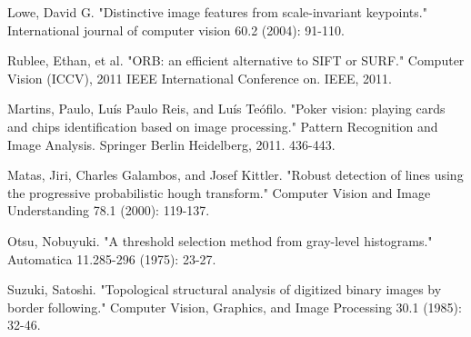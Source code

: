 \documentclass[journal,twoside]{IEEEtran}
\begin{document}
\begin{thebibliography}{9}

Lowe, David G. "Distinctive image features from scale-invariant keypoints." International journal of computer vision 60.2 (2004): 91-110.

Rublee, Ethan, et al. "ORB: an efficient alternative to SIFT or SURF." Computer Vision (ICCV), 2011 IEEE International Conference on. IEEE, 2011.

Martins, Paulo, Luís Paulo Reis, and Luís Teófilo. "Poker vision: playing cards and chips identification based on image processing." Pattern Recognition and Image Analysis. Springer Berlin Heidelberg, 2011. 436-443.

Matas, Jiri, Charles Galambos, and Josef Kittler. "Robust detection of lines using the progressive probabilistic hough transform." Computer Vision and Image Understanding 78.1 (2000): 119-137.

Otsu, Nobuyuki. "A threshold selection method from gray-level histograms." Automatica 11.285-296 (1975): 23-27.

Suzuki, Satoshi. "Topological structural analysis of digitized binary images by border following." Computer Vision, Graphics, and Image Processing 30.1 (1985): 32-46.



\end{thebibliography}
\end{document}
